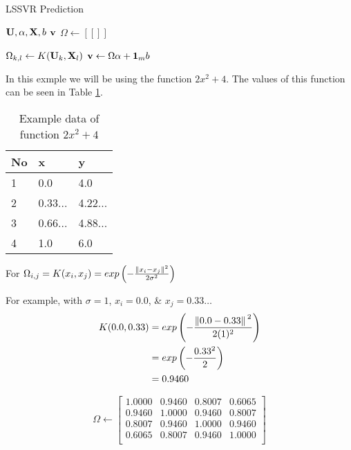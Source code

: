 \begin{algorithm}[H]
        \caption{LSSVR Prediction}\label{alg2:cap}
        \begin{algorithmic}[1]
                \Require $\vb{U}, \vb{\alpha}, \vb{X}, b$
                \Ensure $\vb{v}$
                \State $\Omega \gets [[]]$ 

                \State$\Omega_{k,l}\gets K(\vb{U}_{k},\vb{X}_l)$
                \EndFor
                \EndFor
                \State $\vb{v} \gets \Omega\vb{\alpha} + \vb{1}_{m}b$
        \end{algorithmic}
\end{algorithm}

In this exmple we will be using the function $2x^2+4$. The values of this function can be seen in Table \ref{table:1}.

\begin{table}[H]
        \centering
        \begin{tabular}{@{}lll@{}}
                \toprule
                No & x       & y       \\ \midrule
                1  & 0.0     & 4.0     \\
                2  & 0.33... & 4.22... \\
                3  & 0.66... & 4.88... \\
                4  & 1.0     & 6.0     \\
                \bottomrule
        \end{tabular}
        \caption{Example data of function $2x^2+4$} \label{table:1}
\end{table}
For $\Omega_{i,j}=K(x_i,x_j)=exp \left(-\frac{\norm*{x_i-x_j}^2}{2\sigma^2}\right)$

For example, with $\sigma=1$, $x_i=0.0$, \& $x_j = 0.33\dots$
\begin{equation}
        \begin{split}
                K(0.0,0.33) & = exp\left(-\frac{\norm*{0.0-0.33}^2}{2(1)^2}\right) \\
                & = exp\left(-\frac{0.33^2}{2}\right) \\
                & = 0.9460
        \end{split}
\end{equation}

\begin{equation}
        \Omega\gets
        \begin{bmatrix}
                1.0000 & 0.9460 & 0.8007 & 0.6065 \\
                0.9460 & 1.0000 & 0.9460 & 0.8007 \\
                0.8007 & 0.9460 & 1.0000 & 0.9460 \\
                0.6065 & 0.8007 & 0.9460 & 1.0000 \\
        \end{bmatrix}
\end{equation}

